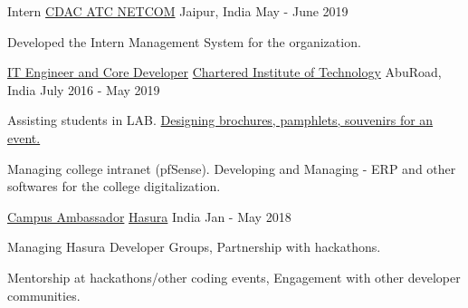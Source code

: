 
\begin{cventries}

   \cventry
	{Intern} %
	{\href{https://www.netcomedu.in/}{CDAC ATC NETCOM}} %
	{Jaipur, India} %
	{May - June 2019} %
	{
		\begin{cvitems} %
			\item {Developed the Intern Management System for the organization.}
		\end{cvitems}
	}
   \cventry
	{\href{https://drive.google.com/drive/folders/1ctuMmFRSP18U_TrqjrOVWXxJXEicQn5n?usp=sharing}{IT Engineer and Core Developer}} %
	{\href{http://citabu.ac.in/}{Chartered Institute of Technology}} %
	{AbuRoad, India} %
	{July 2016 - May 2019} %
	{
		\begin{cvitems} %
			\item {Assisting students in LAB. \href{https://drive.google.com/file/d/18N3tDH6cItm0-5Dkw8gW-p5XGmcwv5ZD/view?usp=sharing}{Designing brochures, pamphlets, souvenirs for an event.}}
			\item {Managing college intranet (pfSense). Developing and Managing - ERP and other softwares for the college digitalization.}
		\end{cvitems}
	}

  \cventry
    {\href{https://drive.google.com/file/d/1X72NUqYnieA3N9TpMftnJDDAonjViYNe/view?usp=sharing}{Campus Ambassador}} %
    {\href{http://hasura.io}{Hasura}} %
    {India} %
    {Jan - May 2018} %
    {
      \begin{cvitems} %
        \item {Managing Hasura Developer Groups, Partnership with hackathons.}
        \item {Mentorship at hackathons/other coding events, Engagement with other developer communities.}
      \end{cvitems}
    }


\end{cventries}
